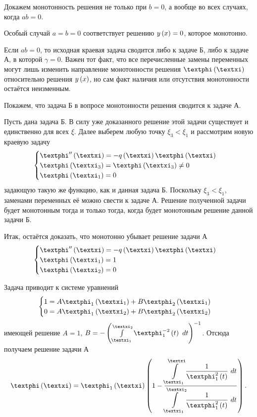 \documentclass[a5paper,10pt]{article}
\begin{document}
\begin{step} Докажем монотонность решения не только при $b = 0$, а вообще во всех случаях, когда $ab = 0$. \end{step}

Особый случай $a = b = 0$ соответствует решению $y\left(x\right) = 0$, которое монотонно.

Если $ab = 0$, то исходная краевая задача сводится либо к задаче Б, либо к задаче А, в которой $\gamma = 0$. Важен тот факт, что все перечисленные замены переменных могут лишь изменить направление монотонности решения $\phi\br{\xi}$ относительно решения $y\left(x\right)$, но сам факт наличия или отсутствия монотонности остаётся неизменным.

Покажем, что задача Б в вопросе монотонности решения сводится к задаче А.

Пусть дана задача Б. В силу уже доказанного решение этой задачи существует и единственно для всех $\xi$. Далее выберем любую точку $\xi_{3} < \xi_{1}$ и рассмотрим новую краевую задачу
$$
\begin{cases} \phi''\br{\xi} = -q\br{\xi}\phi\br{\xi} \\ 
\phi\br{\xi_{3}} = \phi\br{\xi_{3}} \ne 0 \\
\phi\br{\xi_{1}} = 0 \end{cases}
$$
задающую такую же функцию, как и данная задача Б. Поскольку $\xi_{3} < \xi_{1}$, заменами переменных её можно свести к задаче А. Решение полученной задачи будет монотонным тогда и только тогда, когда будет монотонным решение данной задачи Б.

Итак, остаётся доказать, что монотонно убывает решение задачи А
$$\begin{cases} \phi''\br{\xi} = -q\br{\xi}\phi\br{\xi} \\
\phi\br{\xi_{1}} = 1 \\
\phi\br{\xi_{2}} = 0 \end{cases}$$

Задача приводит к системе уравнений
$$\begin{cases}
    1 = A\phi_{1}\br{\xi_{1}} + B\phi_{2}\br{\xi_{1}} \\
    0 = A\phi_{1}\br{\xi_{2}} + B\phi_{2}\br{\xi_{2}}
\end{cases}$$
имеющей решение $A = 1$, $B = - \br{\int\limits_{\xi_{1}}^{\xi_{2}} {\phi_{1}^{-2} \br{t} \ dt}}^{-1}$. Отсюда получаем решение задачи А
$$\phi\br{\xi} = \phi_{1}\br{\xi} \br{1 - \frac {\tintlim{\xi_{1}}{\xi} {\frac {1} {\phi_{1}^{2} \br{t}} \ dt}} {\tintlim{\xi_{1}}{\xi_{2}} {\frac {1} {\phi_{1}^{2} \br{t}} \ dt}}}.$$
\end{document}
